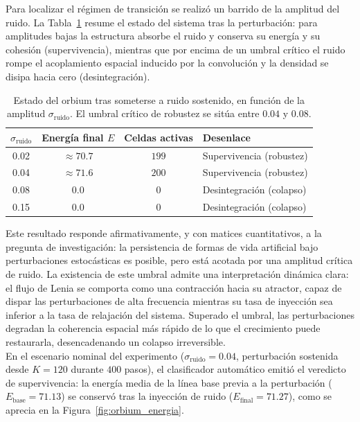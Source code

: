 \documentclass[runningheads]{llncs}
\begin{document}
Para localizar el régimen de transición se realizó un barrido de la amplitud del ruido. La
Tabla~\ref{tab:barrido_sigma} resume el estado del sistema tras la perturbación: para amplitudes
bajas la estructura absorbe el ruido y conserva su energía y su cohesión (supervivencia),
mientras que por encima de un umbral crítico el ruido rompe el acoplamiento espacial inducido por
la convolución y la densidad se disipa hacia cero (desintegración).

\begin{table}[h]
\centering
\begin{tabular}{cccl}
\hline
$\sigma_{\text{ruido}}$ & Energía final $E$ & Celdas activas & Desenlace \\
\hline
0.02 & $\approx 70.7$ & $199$ & Supervivencia (robustez) \\
0.04 & $\approx 71.6$ & $200$ & Supervivencia (robustez) \\
0.08 & $0.0$          & $0$   & Desintegración (colapso) \\
0.15 & $0.0$          & $0$   & Desintegración (colapso) \\
\hline
\end{tabular}
\caption{Estado del orbium tras someterse a ruido sostenido, en función de la amplitud
$\sigma_{\text{ruido}}$. El umbral crítico de robustez se sitúa entre $0.04$ y $0.08$.}
\label{tab:barrido_sigma}
\end{table}

Este resultado responde afirmativamente, y con matices cuantitativos, a la pregunta de
investigación: la persistencia de formas de vida artificial bajo perturbaciones estocásticas es posible, pero está acotada por una amplitud crítica de ruido. La existencia de este umbral admite una interpretación dinámica clara: el flujo de Lenia se comporta como una contracción hacia su atractor, capaz de dispar las perturbaciones de alta frecuencia mientras su tasa de inyección sea inferior a la tasa de relajación del sistema. Superado el umbral, las perturbaciones degradan la coherencia espacial más rápido de lo que el crecimiento puede restaurarla, desencadenando un colapso irreversible.\\

En el escenario nominal del experimento ($\sigma_{\text{ruido}} = 0.04$, perturbación sostenida
desde $K = 120$ durante $400$ pasos), el clasificador automático emitió el veredicto de
supervivencia: la energía media de la línea base previa a la perturbación
($E_{\text{base}} = 71.13$) se conservó tras la inyección de ruido ($E_{\text{final}} = 71.27$),
como se aprecia en la Figura~\ref{fig:orbium_energia}.
\end{document}
